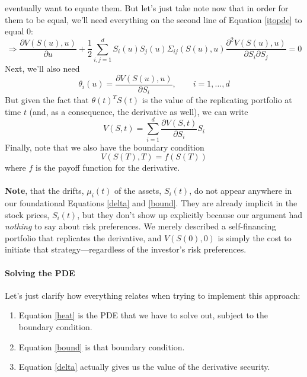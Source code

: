 \documentclass[12pt]{article}
\theoremstyle{plain}
\theoremstyle{definition}
\theoremstyle{remark}
\begin{document}
eventually want to equate them.  But let's just take note now that
in order for them to be equal, we'll need everything on the second
line of Equation \ref{itopde} to equal 0:
\begin{equation}
   \label{heat}
   \Rightarrow \frac{\partial V(S(u),u)}{\partial u} 
   + \frac{1}{2} \sum^d_{i,j =1} S_i(u)S_j(u) \Sigma_{ij}(S(u),u)
   \frac{\partial^2 V(S(u),u)}{\partial S_i \partial S_j} = 0 
\end{equation}
Next, we'll also need 
\begin{equation}
   \label{theta}
   \theta_i(u) = \frac{\partial V(S(u),u)}{\partial S_i},
      \qquad i = 1,\ldots, d
\end{equation}
But given the fact that $\theta(t)^T S(t)$ is the value of the 
replicating portfolio at time $t$
(and, as a consequence, the derivative as well), we can write
\begin{equation}
   \label{delta}
   V(S,t) = \sum^d_{i=1} \frac{\partial V(S,t)}{\partial S_i} S_i 
\end{equation}
Finally, note that we also have the boundary condition 
\begin{equation}
   \label{bound}
   V(S(T),T) = f(S(T)) 
\end{equation}
where $f$ is the payoff function for the derivative.
\\
\\
\textbf{Note}, 
that the drifts, $\mu_i(t)$ of the assets, $S_i(t)$, do not
appear anywhere in our foundational Equations \ref{delta} and 
\ref{bound}. They are already implicit in the stock prices, $S_i(t)$, but
they don't show up explicitly because our argument had \emph{nothing}
to say about risk preferences. We merely described a self-financing
portfolio that replicates the derivative, and $V(S(0),0)$ is simply
the cost to initiate that strategy---regardless of the investor's risk
preferences. 

\paragraph{Solving the PDE} Let's just clarify how everything relates
when trying to implement this approach:
\begin{enumerate}
   \item{Equation \ref{heat} is the PDE that we have to solve
      out, subject to the boundary condition.}
   \item{Equation \ref{bound} is that boundary condition.}
   \item{Equation \ref{delta} actually gives us the value of the
      derivative security.}
\end{enumerate}
\end{document}

